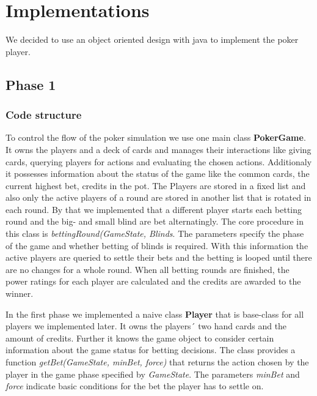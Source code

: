 

\section{Implementations}

We decided to use an object oriented design with java to implement the poker player.

\subsection{Phase 1}

\subsubsection{Code structure}

To control the flow of the poker simulation we use one main class \textbf{PokerGame}.
It owns the players and a deck of cards and manages their interactions like giving cards, querying players for actions and evaluating the chosen actions. Additionaly it possesses information about the status of the game like the common cards, the current highest bet, credits in the pot.
The Players are stored in a fixed list and also only the active players of a round are stored in another list that is rotated in each round. By that we implemented that a different player starts each betting round and the big- and small blind are bet alternatingly. The core procedure in this class is \textit{bettingRound(GameState, Blinds}. The parameters specify the phase of the game and whether betting of blinds is required. With this information the active players are queried to settle their bets and the betting is looped until there are no changes for a whole round. When all betting rounds are finished, the power ratings for each player are calculated and the credits are awarded to the winner.

In the first phase we implemented a naive class \textbf{Player} that is base-class for all players we implemented later. It owns the players´ two hand cards and the amount of credits. Further it knows the game object to consider certain information about the game status for betting decisions. The class provides a function \textit{getBet(GameState, minBet, force)} that returns the action chosen by the player in the game phase specified by \textit{GameState}. The parameters \textit{minBet} and \textit{force} indicate basic conditions for the bet the player has to settle on.

